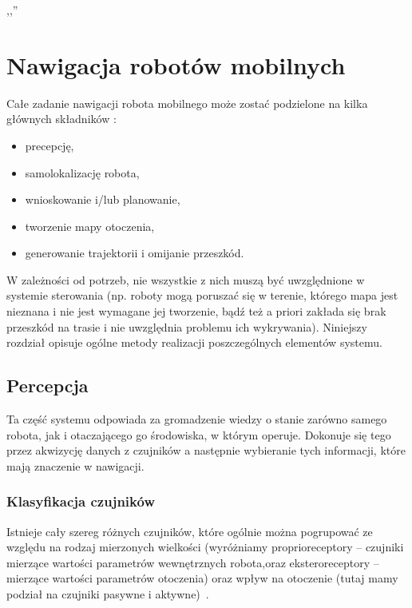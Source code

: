 

\begin{savequote}[70mm]
,,''
\qauthor{}
\end{savequote}

\chapter{Nawigacja robotów mobilnych}
\label{chap:nawigacja}

Całe zadanie nawigacji robota mobilnego może zostać podzielone na kilka głównych
składników \cite[cz.~9]{szynkiewiczWR}:

\begin{itemize}
  \item precepcję,
  \item samolokalizację robota,
  \item wnioskowanie i/lub planowanie,
  \item tworzenie mapy otoczenia,
  \item generowanie trajektorii i omijanie przeszkód.
\end{itemize}

W zależności od potrzeb, nie wszystkie z nich muszą być uwzględnione w systemie
sterowania (np. roboty mogą poruszać się w terenie, którego mapa jest nieznana
i nie jest wymagane jej tworzenie, bądź też a priori zakłada się brak
przeszkód na trasie i nie uwzględnia problemu ich wykrywania). Niniejszy
rozdział opisuje ogólne metody realizacji poszczególnych elementów systemu.

\section{Percepcja}

Ta część systemu odpowiada za gromadzenie wiedzy o stanie zarówno samego robota,
jak i otaczającego go środowiska, w którym operuje. Dokonuje się tego przez
akwizycję danych z czujników a następnie wybieranie tych informacji, które mają
znaczenie w nawigacji. 

\subsection{Klasyfikacja czujników}

Istnieje cały szereg różnych
czujników, które ogólnie można pogrupować ze względu na rodzaj mierzonych
wielkości (wyróżniamy proprioreceptory -- czujniki mierzące wartości parametrów
wewnętrznych robota,oraz eksteroreceptory -- mierzące wartości parametrów
otoczenia) oraz wpływ na otoczenie (tutaj mamy podział na czujniki pasywne i
aktywne)~\cite{siegwart}.


